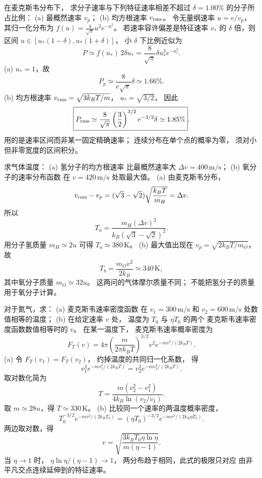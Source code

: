 在麦克斯韦分布下，
求分子速率与下列特征速率相差不超过
$\delta=1.00\%$ 的分子所占比例：
(a) 最概然速率 $v_p$；
(b) 均方根速率 $v_{\rm rms}$。
\exsolution
令无量纲速率 $u=v/v_p$，
其归一化分布为
$f(u)=\frac4{\sqrt\pi}u^2e^{-u^2}$。
若速率容许偏差是特征速率 $v_*$ 的
$\delta$ 倍，则区间
$u\in[u_*(1-\delta),u_*(1+\delta)]$，
小 $\delta$ 下比例近似为
\[
P\simeq f(u_*)\,2\delta u_*
=\frac8{\sqrt\pi}\delta u_*^3e^{-u_*^2}.
\]
(a) $u_*=1$，故
\[
\boxed{P_p\simeq\frac8{e\sqrt\pi}\delta
\simeq1.66\%}.
\]
(b) 均方根速率
$v_{\rm rms}=\sqrt{3k_BT/m}$，
$u_*=\sqrt{3/2}$，
因此
\[
\boxed{P_{\rm rms}\simeq
\frac8{\sqrt\pi}\left(\frac32\right)^{3/2}
e^{-3/2}\delta\simeq1.85\%}.
\]
\excheck 用的是速率区间而非某一固定精确速率；
连续分布在单个点的概率为零，
须对小但非零宽度的区间积分。

求气体温度：
(a) 氢分子的均方根速率
比最概然速率大
$\Delta v=400\,\mathrm{m/s}$；
(b) 氧分子的速率分布函数
在 $v=420\,\mathrm{m/s}$ 处取最大值。
\exsolution
(a) 由麦克斯韦分布，
\[
v_{\rm rms}-v_p
=(\sqrt3-\sqrt2)\sqrt{\frac{k_BT}{m_H}}
=\Delta v.
\]
所以
\[
\boxed{T_a=\frac{m_H(\Delta v)^2}
{k_B(\sqrt3-\sqrt2)^2}}.
\]
用分子氢质量 $m_H\simeq2u$
可得
$\boxed{T_a\simeq380\,\mathrm K}$。
(b) 最大值出现在
$v_p=\sqrt{2k_BT/m_O}$，
故
\[
\boxed{T_b=\frac{m_Ov^2}{2k_B}
\simeq340\,\mathrm K},
\]
其中氧分子质量 $m_O\simeq32u$。
\excheck 这两问的气体摩尔质量不同；
不能把氢分子的质量用于氧分子计算。

对于氮气，求：
(a) 麦克斯韦速率密度函数
在 $v_1=300\,\mathrm{m/s}$ 和
$v_2=600\,\mathrm{m/s}$ 处数值相等的温度；
(b) 在给定速率 $v$ 处，
温度为 $T_0$ 与 $\eta T_0$ 的两个
麦克斯韦速率密度函数数值相等时的 $v$。
\exsolution
在某一温度下，
麦克斯韦速率概率密度为
\[
F_T(v)=4\pi\left(\frac m{2\pi k_BT}\right)^{3/2}
v^2e^{-mv^2/(2k_BT)}.
\]
(a) 令 $F_T(v_1)=F_T(v_2)$，
约掉温度的共同归一化系数，
得
\[
v_1^2e^{-mv_1^2/(2k_BT)}
=v_2^2e^{-mv_2^2/(2k_BT)}.
\]
取对数化简为
\[
\boxed{T=
\frac{m(v_2^2-v_1^2)}
{4k_B\ln(v_2/v_1)}}.
\]
取 $m\simeq28u$，得
$\boxed{T\simeq330\,\mathrm K}$。
(b) 比较同一个速率的两温度概率密度，
\[
T_0^{-3/2}e^{-mv^2/(2k_BT_0)}
=(\eta T_0)^{-3/2}
e^{-mv^2/(2k_B\eta T_0)}.
\]
两边取对数，得
\[
\boxed{v=
\sqrt{\frac{3k_BT_0\eta\ln\eta}
{m(\eta-1)}}}.
\]
\excheck 当 $\eta\to1$ 时，
$\eta\ln\eta/(\eta-1)\to1$，
两分布趋于相同，此式的极限只对应
由非平凡交点连续延伸到的特征速率。

